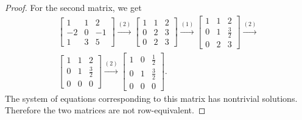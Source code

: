 \begin{proof}
  For the second matrix, we get
  \begin{gather*}
    \begin{bmatrix}
      1 & 1 & 2 \\
      -2 & 0 & -1 \\
      1 & 3 & 5
    \end{bmatrix}
    \xrightarrow{(2)}
    \begin{bmatrix}
      1 & 1 & 2 \\
      0 & 2 & 3 \\
      0 & 2 & 3
    \end{bmatrix}
    \xrightarrow{(1)}
    \begin{bmatrix}
      1 & 1 & 2 \\[3pt]
      0 & 1 & \frac32 \\[3pt]
      0 & 2 & 3
    \end{bmatrix}
    \xrightarrow{(2)} \\
    \begin{bmatrix}
      1 & 1 & 2 \\[3pt]
      0 & 1 & \frac32 \\[3pt]
      0 & 0 & 0
    \end{bmatrix}
    \xrightarrow{(2)}
    \begin{bmatrix}
      1 & 0 & \frac12 \\[3pt]
      0 & 1 & \frac32 \\[3pt]
      0 & 0 & 0
    \end{bmatrix}.
  \end{gather*}
  The system of equations corresponding to this matrix has nontrivial
  solutions. Therefore the two matrices are not row-equivalent.
\end{proof}


